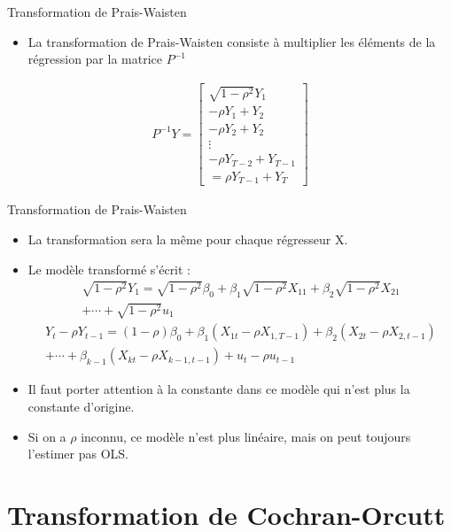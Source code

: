 \documentclass{beamer}
\begin{document}
\begin{frame}{Transformation de Prais-Waisten}
\begin{itemize}
\item La transformation de Prais-Waisten consiste à multiplier  les éléments de la régression par la matrice $P^{-1}$
\end{itemize}

\begin{align*}
P^{-1} Y = \begin{bmatrix}
\sqrt{1-\rho^2}Y_1 \\
-\rho Y_1 + Y_2 \\
-\rho Y_2 + Y_2 \\
\vdots \\
-\rho Y_{T-2}+Y_{T-1}\\
=\rho Y_{T-1} + Y_T 
\end{bmatrix} 
\end{align*}

\end{frame}

\begin{frame}{Transformation de Prais-Waisten}
\begin{itemize}
\item La transformation sera la même pour chaque régresseur X. 
\item Le modèle transformé s’écrit :
\begin{align*}
\sqrt{1-\rho^2}Y_1=\sqrt{1-\rho^2}\beta_0 + \beta_1 \sqrt{1-\rho^2}X_{11}+\beta_2 \sqrt{1-\rho^2}X_{21}\\ + \cdots+ \sqrt{1-\rho^2}u_1
\end{align*}
\begin{align*}
Y_t-\rho Y_{t-1}=(1-\rho) \beta_0+\beta_1 (X_{1t}-\rho X_{1,T-1})+\beta_2 (X_ {2t}-\rho X_{2,t-1}) \\ + \cdots +\beta_{k-1} (X_{kt}-\rho X_{k-1,t-1})+u_t-\rho u_{t-1}
\end{align*}
\item Il faut porter attention à la constante dans ce modèle qui n’est plus la constante d’origine.
\item Si on a $\rho$ inconnu, ce modèle n’est plus linéaire, mais on peut toujours l’estimer pas OLS.
\end{itemize}
\end{frame}


\section{Transformation de Cochran-Orcutt}
\end{document}
